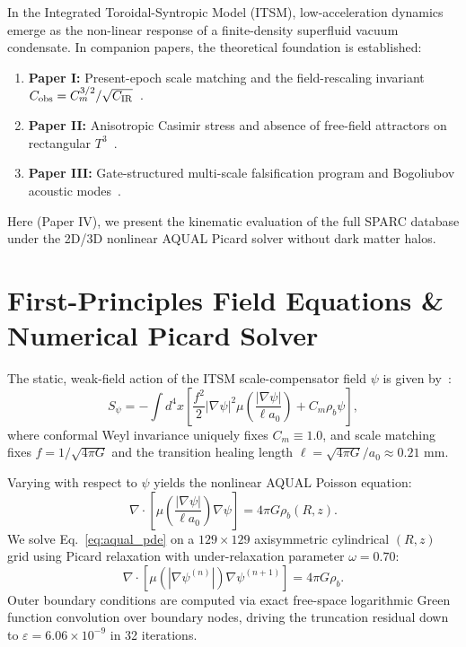 \documentclass[aps,prd,twocolumn,superscriptaddress,nofootinbib,amsmath,amssymb]{revtex4-2}
\begin{document}
In the Integrated Toroidal-Syntropic Model (ITSM), low-acceleration dynamics emerge as the non-linear response of a finite-density superfluid vacuum condensate. In companion papers, the theoretical foundation is established:
\begin{enumerate}
    \item \textbf{Paper I:} Present-epoch scale matching and the field-rescaling invariant $C_{\rm obs} = C_m^{3/2}/\sqrt{C_{\rm IR}}$~\cite{boyd_p1_2026}.
    \item \textbf{Paper II:} Anisotropic Casimir stress and absence of free-field attractors on rectangular $T^3$~\cite{boyd_p2_2026}.
    \item \textbf{Paper III:} Gate-structured multi-scale falsification program and Bogoliubov acoustic modes~\cite{boyd_p3_2026}.
\end{enumerate}

Here (Paper IV), we present the kinematic evaluation of the full SPARC database under the 2D/3D nonlinear AQUAL Picard solver without dark matter halos.

\section{First-Principles Field Equations \& Numerical Picard Solver}
\label{sec:solver}

The static, weak-field action of the ITSM scale-compensator field $\psi$ is given by~\cite{bekenstein_milgrom_1984,boyd_core_v12}:
\begin{equation}
S_\psi = -\int d^4x \left[ \frac{f^2}{2} |\nabla\psi|^2 \mu\left(\frac{|\nabla\psi|}{\ell a_0}\right) + C_m \rho_b \psi \right],
\label{eq:aqual_action}
\end{equation}
where conformal Weyl invariance uniquely fixes $C_m \equiv 1.0$, and scale matching fixes $f = 1/\sqrt{4\pi G}$ and the transition healing length $\ell = \sqrt{4\pi G}/a_0 \approx 0.21\text{ mm}$.

Varying with respect to $\psi$ yields the nonlinear AQUAL Poisson equation:
\begin{equation}
\nabla \cdot \left[ \mu\left(\frac{|\nabla\psi|}{\ell a_0}\right) \nabla\psi \right] = 4\pi G \rho_b(R, z).
\label{eq:aqual_pde}
\end{equation}
We solve Eq.~\eqref{eq:aqual_pde} on a $129 \times 129$ axisymmetric cylindrical $(R, z)$ grid using Picard relaxation with under-relaxation parameter $\omega = 0.70$:
\begin{equation}
\nabla \cdot \left[ \mu(|\nabla\psi^{(n)}|) \nabla\psi^{(n+1)} \right] = 4\pi G \rho_b.
\end{equation}
Outer boundary conditions are computed via exact free-space logarithmic Green function convolution over boundary nodes, driving the truncation residual down to $\varepsilon = 6.06 \times 10^{-9}$ in 32 iterations.
\end{document}
